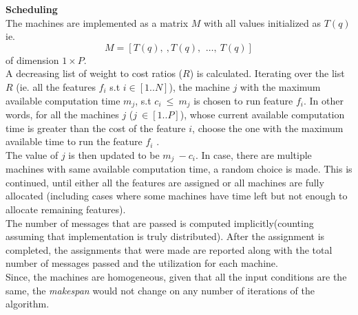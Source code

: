 \documentclass[10pt, conference, compsocconf]{IEEEtran}
\begin{document}
\textbf{Scheduling}\\
The machines are implemented as a matrix $M$ with all values initialized as $T(q)$ ie. $$M =[T(q),\ ,T(q),\, \ \dots,\ T(q)]$$ of dimension $1\times P$.\\
 A decreasing list of weight to cost ratios ($R$) is calculated. Iterating over the list $R$ (ie. all the features $f_i$ s.t $i\in[1 .. N]$), the machine $j$ with the maximum available computation time $m_j$,  s.t $c_i\ \leq\ m_j$ is chosen to run feature $f_i$. In other words, for all the machines $j$ ($j\ \in [1..P]$), whose current available computation time is greater than the cost of the feature $i$, choose the one with the maximum available time to run the feature $f_i$ . \\
The value of $j$ is then updated to be $m_j\ - c_i$. In case, there are multiple machines with same available computation time, a random choice is made. This is continued, until either all the features are assigned or all machines are fully allocated (including cases where some machines have time left but not enough to allocate remaining features).\\
The number of messages that are passed is computed implicitly(counting assuming that implementation is truly distributed). After the assignment is completed, the assignments that were made are reported along with the total number of messages passed and the utilization for each machine. \\
Since, the machines are homogeneous, given that all the input conditions are the same, the \textit{makespan} would not change on any number of iterations of the algorithm.\\
\end{document}
